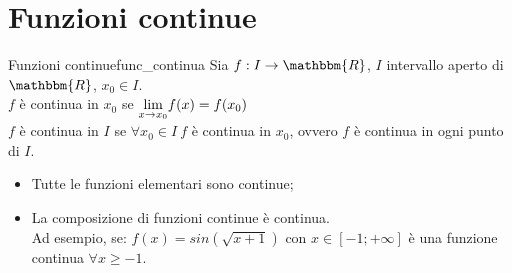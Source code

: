 \documentclass[12pt]{report}
\newcounter{definition}
\newcommand{\nmu}{}
\begin{document}
  	\section{Funzioni continue}
  	\begin{definition}{\nmu Funzioni continue}{func_continua}
  		Sia $f: I \to \mathbbm{R}$, $I$ intervallo aperto di $\mathbbm{R}$, $x_0 \in I$. \\
  		$f$ è continua in $x_0$ se $\mathlarger{\lim_{x \to {x_0}}}f(x) = f(x_0)$ \\
  		$f$ è continua in $I$ se $\forall x_0 \in I\ f$ è continua in $x_0$, ovvero $f$ è continua in ogni punto di $I$.
  	\end{definition}
  	\begin{note}{}{}
  		\begin{itemize}
  			\item Tutte le funzioni elementari sono continue;
  			\item La composizione di funzioni continue è continua. \\
  			Ad esempio, se: $f(x) = sin(\sqrt{x + 1})$ con $x \in [-1; +\infty]$ è una funzione continua $\forall x \geq -1$.
  		\end{itemize}
  	\end{note}
\end{document}
